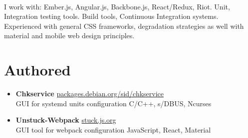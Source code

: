 \documentclass[a4paper,11pt]{article}
\begin{document}
{\paragraph{} I work with: Ember.js, Angular.js, Backbone.js, React/Redux, Riot. Unit, Integration testing tools. Build tools, Continuous Integration systems. Experienced with general CSS frameworks, degradation strategies as well with material and mobile web design principles.
%
%
%
%
\section*{Authored}

\begin{itemize}[itemsep=4pt,label=]
  \item \textbf{Chkservice} \href{https://packages.debian.org/sid/chkservice}{packages.debian.org/sid/chkservice}\\
    GUI for systemd units configuration  \hfill  C/C++, s/DBUS, Ncurses

  \item \textbf{Unstuck-Webpack} \href{https://stuck.js.org}{stuck.js.org}\\
    GUI tool for webpack configuration \hfill  JavaScript, React, Material


\end{itemize}}
\end{document}

